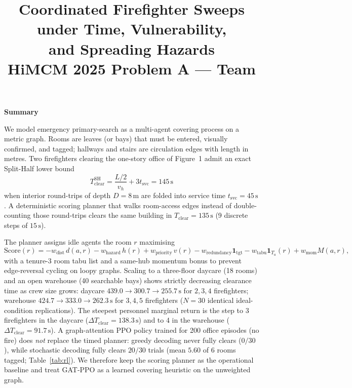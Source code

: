 \documentclass[12pt]{article}
\title{\textbf{Coordinated Firefighter Sweeps under Time, Vulnerability,\\
and Spreading Hazards}\\[0.4em]
\large HiMCM 2025 Problem A --- Team \TeamNumber}
\author{}
\date{}
\newcommand{\Tclear}{T_{\mathrm{clear}}}
\newcommand{\tsvc}{t_{\mathrm{svc}}}
\newcommand{\whall}{v_{h}}
\begin{document}
\maketitle
\thispagestyle{empty}

\begin{center}
{\Large \textbf{Summary}}
\end{center}

We model emergency primary-search as a multi-agent covering process on a metric graph.
Rooms are leaves (or bays) that must be entered, visually confirmed, and tagged; hallways
and stairs are circulation edges with length in metres. Two firefighters clearing the
one-story office of Figure~1 admit an exact Split-Half lower bound
\begin{equation*}
  \Tclear^{\mathrm{SH}}
  = \frac{L/2}{\whall} + 3\tsvc
  = 145\,\mathrm{s}
\end{equation*}
when interior round-trips of depth \(D=8\,\mathrm{m}\) are folded into service time
\(\tsvc=45\,\mathrm{s}\). A deterministic scoring planner that walks room-access edges
instead of double-counting those round-trips clears the same building in
\(\Tclear=135\,\mathrm{s}\) (9 discrete steps of \(15\,\mathrm{s}\)).

The planner assigns idle agents the room \(r\) maximising
\begin{equation*}
  \mathrm{Score}(r)
  = -w_{\mathrm{dist}}\,d(a,r)
    -w_{\mathrm{hazard}}\,h(r)
    +w_{\mathrm{priority}}\,v(r)
    -w_{\mathrm{redundancy}}\mathbf{1}_{\mathrm{tgt}}
    -w_{\mathrm{tabu}}\mathbf{1}_{T_a}(r)
    +w_{\mathrm{mom}}M(a,r),
\end{equation*}
with a tenure-3 room tabu list and a same-hub momentum bonus to prevent edge-reversal
cycling on loopy graphs. Scaling to a three-floor daycare (18 rooms) and an open
warehouse (40 searchable bays) shows strictly decreasing clearance time as crew size
grows: daycare \(439.0\to 300.7\to 255.7\,\mathrm{s}\) for \(2,3,4\) firefighters;
warehouse \(424.7\to 333.0\to 262.3\,\mathrm{s}\) for \(3,4,5\) firefighters
(\(N=30\) identical ideal-condition replications). The steepest personnel marginal
return is the step to 3 firefighters in the daycare (\(\Delta\Tclear=138.3\,\mathrm{s}\))
and to 4 in the warehouse (\(\Delta\Tclear=91.7\,\mathrm{s}\)).
A graph-attention PPO policy trained for 200 office episodes (no fire) does
\emph{not} replace the timed planner: greedy decoding never fully clears
(\(0/30\)), while stochastic decoding fully clears \(20/30\) trials
(mean \(5.60\) of \(6\) rooms tagged; Table~\ref{tab:rl}). We therefore keep the
scoring planner as the operational baseline and treat GAT-PPO as a learned
covering heuristic on the unweighted graph.
\end{document}
